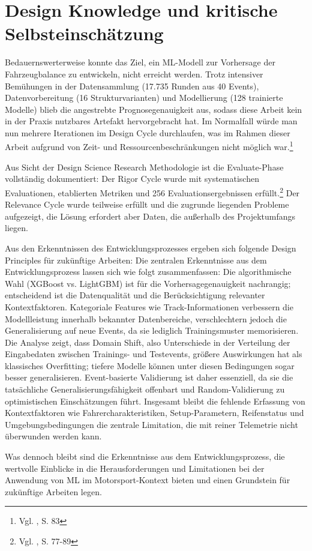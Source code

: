 \section{Design Knowledge und kritische Selbsteinschätzung}

Bedauernswerterweise konnte das Ziel, ein \ac{ML}-Modell zur Vorhersage der Fahrzeugbalance zu entwickeln, nicht erreicht werden. Trotz intensiver Bemühungen in der Datensammlung (17.735 Runden aus 40 Events), Datenvorbereitung (16 Strukturvarianten) und Modellierung (128 trainierte Modelle) blieb die angestrebte Prognosegenauigkeit aus, sodass diese Arbeit kein in der Praxis nutzbares Artefakt hervorgebracht hat. Im Normalfall würde man nun mehrere Iterationen im Design Cycle durchlaufen, was im Rahmen dieser Arbeit aufgrund von Zeit- und Ressourcenbeschränkungen nicht möglich war.\footnote{Vgl. \cite{Hevner2004}, S. 83}

Aus Sicht der Design Science Research Methodologie ist die Evaluate-Phase vollständig dokumentiert: Der Rigor Cycle wurde mit systematischen Evaluationen, etablierten Metriken und 256 Evaluationsergebnissen erfüllt.\footnote{Vgl. \cite{Venable2016}, S. 77-89} Der Relevance Cycle wurde teilweise erfüllt und die zugrunde liegenden Probleme aufgezeigt, die Lösung erfordert aber Daten, die außerhalb des Projektumfangs liegen.

Aus den Erkenntnissen des Entwicklungsprozesses ergeben sich folgende Design Principles für zukünftige Arbeiten:
Die zentralen Erkenntnisse aus dem Entwicklungsprozess lassen sich wie folgt zusammenfassen: Die algorithmische Wahl (XGBoost vs. LightGBM) ist für die Vorhersagegenauigkeit nachrangig; entscheidend ist die Datenqualität und die Berücksichtigung relevanter Kontextfaktoren. Kategoriale Features wie Track-Informationen verbessern die Modellleistung innerhalb bekannter Datenbereiche, verschlechtern jedoch die Generalisierung auf neue Events, da sie lediglich Trainingsmuster memorisieren. Die Analyse zeigt, dass Domain Shift, also Unterschiede in der Verteilung der Eingabedaten zwischen Trainings- und Testevents, größere Auswirkungen hat als klassisches Overfitting; tiefere Modelle können unter diesen Bedingungen sogar besser generalisieren. Event-basierte Validierung ist daher essenziell, da sie die tatsächliche Generalisierungsfähigkeit offenbart und Random-Validierung zu optimistischen Einschätzungen führt. Insgesamt bleibt die fehlende Erfassung von Kontextfaktoren wie Fahrercharakteristiken, Setup-Parametern, Reifenstatus und Umgebungsbedingungen die zentrale Limitation, die mit reiner Telemetrie nicht überwunden werden kann.

Was dennoch bleibt sind die Erkenntnisse aus dem Entwicklungsprozess, die wertvolle Einblicke in die Herausforderungen und Limitationen bei der Anwendung von \ac{ML} im Motorsport-Kontext bieten und einen Grundstein für zukünftige Arbeiten legen.
